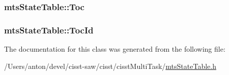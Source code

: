 \subsubsection[{Toc}]{ mts\+State\+Table\+::\+Toc}\label{classmts_state_table_a03193d2edccd43f42e65aaec7207708f}
\hypertarget{classmts_state_table_aa2e6cbe1e5ae5a1a58ebe3fcff10db35}{}
\subsubsection[{Toc\+Id}]{ mts\+State\+Table\+::\+Toc\+Id\hspace{0.3cm}{\ttfamily [protected]}}\label{classmts_state_table_aa2e6cbe1e5ae5a1a58ebe3fcff10db35}


The documentation for this class was generated from the following file\+:\begin{DoxyCompactItemize}
\item 
/\+Users/anton/devel/cisst-\/saw/cisst/cisst\+Multi\+Task/\hyperlink{mts_state_table_8h}{mts\+State\+Table.\+h}\end{DoxyCompactItemize}
